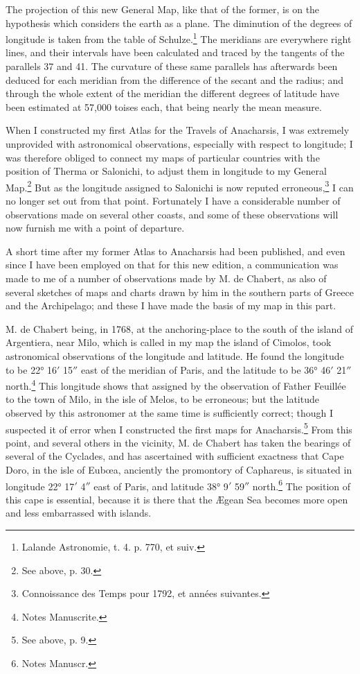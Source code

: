 \documentclass[a4paper, 11pt, oneside, polutonikogreek, english]{article}
\begin{document}
The projection of this new General Map, like that of the former, is on the hypothesis which considers the earth as a plane. The diminution of the degrees of longitude is taken from the table of Schulze.\footnote{Lalande Astronomie, t. 4. p. 770, et suiv.} The meridians are everywhere right lines, and their intervals have been calculated and traced by the tangents of the parallels 37 and 41. The curvature of these same parallels has afterwards been deduced for each meridian from the difference of the secant and the radius; and through the whole extent of the meridian the different degrees of latitude have been estimated at 57,000 toises each, that being nearly the mean measure.

When I constructed my first Atlas for the Travels of Anacharsis, I was extremely unprovided with astronomical observations, especially with respect to longitude; I was therefore obliged to connect my maps of particular countries with the position of Therma or Salonichi, to adjust them in longitude to my General Map.\footnote{See above, p. 30.} But as the longitude assigned to Salonichi is now reputed erroneous,\footnote{Connoissance des Temps pour 1792, et années suivantes.} I can no longer set out from that point. Fortunately I have a considerable number of observations made on several other coasts, and some of these observations will now furnish me with a point of departure.

A short time after my former Atlas to Anacharsis had been published, and even since I have been employed on that for this new edition, a communication was made to me of a number of observations made by M. de Chabert, as also of several sketches of maps and charts drawn by him in the southern parts of Greece and the Archipelago; and these I have made the basis of my map in this part.

M. de Chabert being, in 1768, at the anchoring-place to the south of the island of Argentiera, near Milo, which is called in my map the island of Cimolos, took astronomical observations of the longitude and latitude. He found the longitude to be 22° 16$'$ 15$''$ east of the meridian of Paris, and the latitude to be 36° 46$'$ 21$''$ north.\footnote{Notes Manuscrite.} This longitude shows that assigned by the observation of Father Feuillée to the town of Milo, in the isle of Melos, to be erroneous; but the latitude observed by this astronomer at the same time is sufficiently correct; though I suspected it of error when I constructed the first maps for Anacharsis.\footnote{See above, p. 9.} From this point, and several others in the vicinity, M. de Chabert has taken the bearings of several of the Cyclades, and has ascertained with sufficient exactness that Cape Doro, in the isle of Eubœa, anciently the promontory of Caphareus, is situated in longitude 22° 17$'$ 4$''$ east of Paris, and latitude 38° 9$'$ 59$''$ north.\footnote{Notes Manuscr.} The position of this cape is essential, because it is there that the Ægean Sea becomes more open and less embarrassed with islands.
\end{document}
